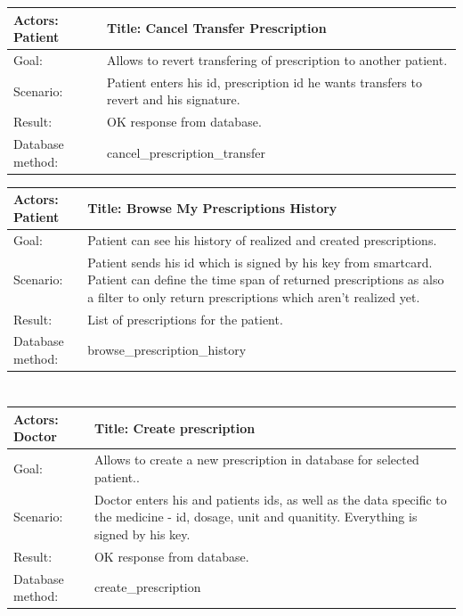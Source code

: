     \begin{longtable}{| p{6cm} | p{7.75cm} |}
    \hline
    Actors: Patient &Title: Cancel Transfer Prescription \\ \hline
    Goal: & Allows to revert transfering of prescription to another patient. \\ \hline
    Scenario: & Patient enters his id, prescription id he wants transfers to revert and his signature. \\ \hline
    Result: & OK response from database. \\ \hline
    Database  method: & cancel\_prescription\_transfer \\ \hline
\end{longtable}

    \begin{longtable}{| p{6cm} | p{7.75cm} |}
    \hline
    Actors: Patient &Title: Browse My Prescriptions History \\ \hline
    Goal: & Patient can see his history of realized and created prescriptions.\\ \hline
    Scenario: & Patient sends his id which is signed by his key from smartcard. Patient can define the time span of returned prescriptions as also a filter to only return prescriptions which aren't realized yet. \\ \hline
    Result: & List of prescriptions for the patient. \\ \hline
    Database  method: & browse\_prescription\_history \\ \hline

\end{longtable}

\normalsize
\newpage
\section{}

\small
    \begin{longtable}{| p{6cm} | p{7.75cm} |}
    \hline
   Actors:  Doctor &Title: Create prescription \\ \hline
    Goal: & Allows to create a new prescription in database for selected patient..\\ \hline
    Scenario: & Doctor enters his and patients ids, as well as the data specific to the medicine - id, dosage, unit and quanitity. Everything is signed by his key. \\ \hline
    Result: & OK response from database. \\ \hline
    Database  method: & create\_prescription \\ \hline
    \end{longtable}



